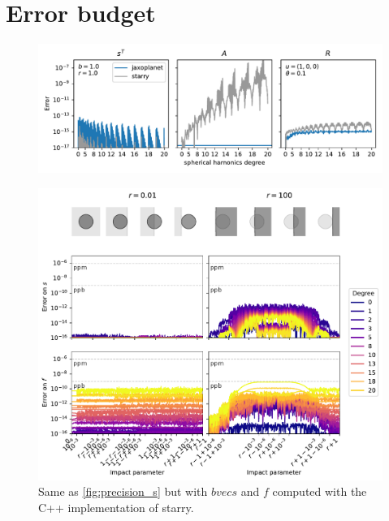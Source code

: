 \documentclass[modern]{aastex631}
\begin{document}
\section{Error budget}
\begin{figure}[H]
    \begin{center}
        \includegraphics[width=\textwidth]{../workflows/precision/figures/error_SAR.pdf}
        \caption{}
        \label{fig:precision_SAR}
    \end{center}
\end{figure}

\begin{figure}[H]
    \begin{center}
        \includegraphics[width=\textwidth]{../workflows/precision/figures/error_starry.pdf}
        \caption{Same as \autoref{fig:precision_s} but with $bvec{s}$ and $f$ computed with the C++ implementation of \textsf{starry}. }
        \label{fig:precision_s_starry}
    \end{center}
\end{figure}
\end{document}
